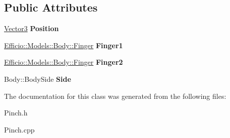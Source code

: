 \subsection*{Public Attributes}
\begin{DoxyCompactItemize}
\item 
\hyperlink{class_efficio_1_1_vector3}{Vector3} {\bfseries Position}\hypertarget{class_efficio_1_1_input_recognition_1_1_human_1_1_hands_1_1_pinch_aef25b5e89e91b9e9a7886a087c1b019f}{}\label{class_efficio_1_1_input_recognition_1_1_human_1_1_hands_1_1_pinch_aef25b5e89e91b9e9a7886a087c1b019f}

\item 
\hyperlink{class_efficio_1_1_models_1_1_body_1_1_finger}{Efficio\+::\+Models\+::\+Body\+::\+Finger} {\bfseries Finger1}\hypertarget{class_efficio_1_1_input_recognition_1_1_human_1_1_hands_1_1_pinch_a4ed288ec140ac43c76f4b4badf3d0876}{}\label{class_efficio_1_1_input_recognition_1_1_human_1_1_hands_1_1_pinch_a4ed288ec140ac43c76f4b4badf3d0876}

\item 
\hyperlink{class_efficio_1_1_models_1_1_body_1_1_finger}{Efficio\+::\+Models\+::\+Body\+::\+Finger} {\bfseries Finger2}\hypertarget{class_efficio_1_1_input_recognition_1_1_human_1_1_hands_1_1_pinch_a3eb061402a4ba055bf8239f955c7e618}{}\label{class_efficio_1_1_input_recognition_1_1_human_1_1_hands_1_1_pinch_a3eb061402a4ba055bf8239f955c7e618}

\item 
Body\+::\+Body\+Side {\bfseries Side}\hypertarget{class_efficio_1_1_input_recognition_1_1_human_1_1_hands_1_1_pinch_afacf4440ba63d00e52e205b0710798d1}{}\label{class_efficio_1_1_input_recognition_1_1_human_1_1_hands_1_1_pinch_afacf4440ba63d00e52e205b0710798d1}

\end{DoxyCompactItemize}


The documentation for this class was generated from the following files\+:\begin{DoxyCompactItemize}
\item 
Pinch.\+h\item 
Pinch.\+cpp\end{DoxyCompactItemize}
